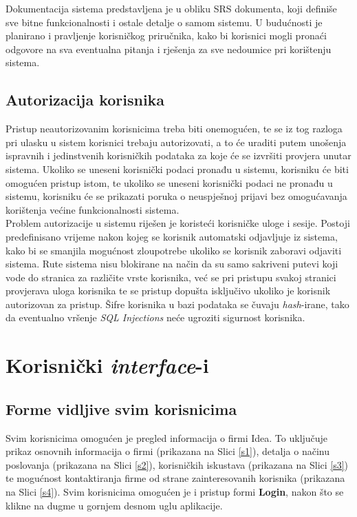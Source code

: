 \documentclass[12pt,a4paper]{article}
\begin{document}
Dokumentacija sistema predstavljena je u obliku SRS dokumenta, koji definiše sve bitne funkcionalnosti i ostale detalje o samom sistemu. U budućnosti je planirano i pravljenje korisničkog priručnika, kako bi korisnici mogli pronaći odgovore na sva eventualna pitanja i rješenja za sve nedoumice pri korištenju sistema.

\subsection{Autorizacija korisnika}

\quad Pristup neautorizovanim korisnicima treba biti onemogućen, te se iz tog razloga pri ulasku u sistem korisnici trebaju autorizovati, a to će uraditi putem unošenja ispravnih i jedinstvenih korisničkih podataka za koje će se izvršiti provjera unutar sistema. Ukoliko se uneseni korisnički podaci pronađu u sistemu, korisniku će biti omogućen pristup istom, te ukoliko se uneseni korisnički podaci ne pronađu u sistemu, korisniku će se prikazati poruka o neuspješnoj prijavi bez omogućavanja korištenja većine funkcionalnosti sistema. \\

Problem autorizacije u sistemu riješen je koristeći korisničke uloge i sesije. Postoji predefinisano vrijeme nakon kojeg se korisnik automatski odjavljuje iz sistema, kako bi se smanjila mogućnost zloupotrebe ukoliko se korisnik zaboravi odjaviti sistema. Rute sistema nisu blokirane na način da su samo sakriveni putevi koji vode do stranica za različite vrste korisnika, već se pri pristupu svakoj stranici provjerava uloga korisnika te se pristup dopušta isključivo ukoliko je korisnik autorizovan za pristup. Šifre korisnika u bazi podataka se čuvaju \textit{hash}-irane, tako da eventualno vršenje \textit{SQL Injections} neće ugroziti sigurnost korisnika.

\newpage

\section{Korisnički \textit{interface}-i}

\subsection{Forme vidljive svim korisnicima}

Svim korisnicima omogućen je pregled informacija o firmi Idea. To uključuje prikaz osnovnih informacija o firmi (prikazana na Slici \ref{s1}), detalja o načinu poslovanja (prikazana na Slici \ref{s2}), korisničkih iskustava (prikazana na Slici \ref{s3}) te mogućnost kontaktiranja firme od strane zainteresovanih korisnika (prikazana na Slici \ref{s4}). Svim korisnicima omogućen je i pristup formi \textbf{Login}, nakon što se klikne na dugme u gornjem desnom uglu aplikacije.
\end{document}
